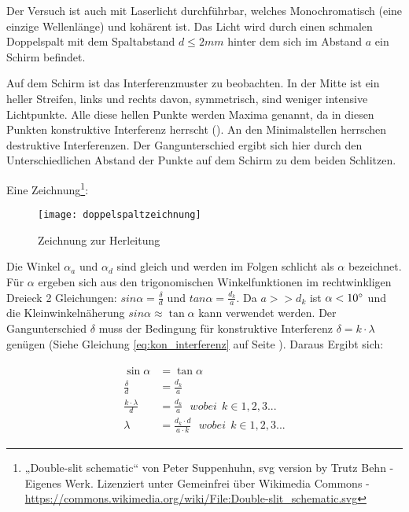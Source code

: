 Der Versuch ist auch mit Laserlicht durchführbar, welches Monochromatisch (eine einzige Wellenlänge) und kohärent ist. Das Licht wird durch einen schmalen Doppelspalt mit dem Spaltabstand $d \leq 2mm$ hinter dem sich im Abstand $a$ ein Schirm befindet. 
	
Auf dem Schirm ist das Interferenzmuster zu beobachten. In der Mitte ist ein heller Streifen, links und rechts davon, symmetrisch, sind weniger intensive Lichtpunkte. Alle diese hellen Punkte werden Maxima genannt, da in diesen Punkten konstruktive Interferenz herrscht (). An den Minimalstellen herrschen destruktive Interferenzen. Der Gangunterschied ergibt sich hier durch den Unterschiedlichen Abstand der Punkte auf dem Schirm zu dem beiden Schlitzen.
	
Eine Zeichnung\footnote{„Double-slit schematic“ von Peter Suppenhuhn, svg version by Trutz Behn - Eigenes Werk. Lizenziert unter Gemeinfrei über Wikimedia Commons - \url{https://commons.wikimedia.org/wiki/File:Double-slit_schematic.svg}}:

\begin{figure}[h!]
		\center
		\texttt{[image: doppelspaltzeichnung]}
		\caption{Zeichnung zur Herleitung}
\end{figure}
	
Die Winkel $\alpha_a$ und $\alpha_d$ sind gleich und werden im Folgen schlicht als $\alpha$ bezeichnet. Für $\alpha$ ergeben sich aus den trigonomischen Winkelfunktionen im rechtwinkligen Dreieck 2 Gleichungen: $sin{\alpha}=\frac{\delta}{d}$ und $tan{\alpha}=\frac{d_k}{a}$. Da $a>>d_k$ ist $\alpha<10 \degree$ und die Kleinwinkelnäherung $sin{\alpha} \approx \tan{\alpha}$ kann verwendet werden. Der Gangunterschied $\delta$ muss der Bedingung für konstruktive Interferenz $\delta = k \cdot \lambda$ genügen (Siehe Gleichung \ref{eq:kon_interferenz} auf Seite \pageref{eq:kon_interferenz}). Daraus Ergibt sich:
	
\begin{align}
\begin{split}
	\sin{\alpha} &= \tan{\alpha} \\
	\frac{\delta}{d} &= \frac{d_k}{a} \\
	\frac{k \cdot \lambda}{d} &= \frac{d_k}{a}  \ \ \ wobei \ \ k \in 1,2,3... \\
	\lambda &= \frac{d_{k} \cdot d}{a \cdot k}  \ \ \ wobei \ \ k \in 1,2,3...
\end{split}
\end{align}
	
